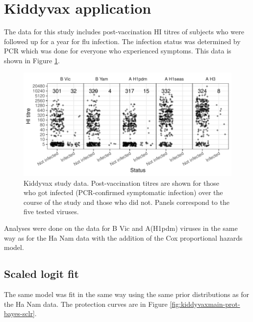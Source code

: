 \documentclass[12pt]{article}
\begin{document}
\pagebreak
\section{Kiddyvax application}

The data for this study includes post-vaccination HI titres of subjects who were followed up for a year for flu infection. The infection status was determined by PCR which was done for everyone who experienced symptoms. This data is shown in Figure \ref{fig:kiddyvax-main-titre}.

\begin{figure}[htp]
	\centering
	\includegraphics[width=1\textwidth]{../data-plot/kiddyvax-main-titre.pdf}
	\caption{
	Kiddyvax study data. Post-vaccination titres are shown for those who got infected (PCR-confirmed symptomatic infection) over the course of the study and those who did not. Panels correspond to the five tested viruses.
	}
	\label{fig:kiddyvax-main-titre}
\end{figure}

Analyses were done on the data for B Vic and A(H1pdm) viruses in the same way as for the Ha Nam data with the addition of the Cox proportional hazards model.

\pagebreak
%
\subsection{Scaled logit fit}

The same model was fit in the same way using the same prior distributions as for the Ha Nam data. The protection curves are in Figure \ref{fig:kiddyvaxmain-prot-bayes-sclr}.
\end{document}
